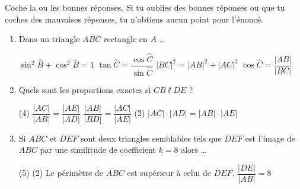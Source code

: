 %
%
    Coche la ou les bonnes réponses. Si tu oublies des bonnes réponses ou que tu coches des mauvaises réponses, tu n'obtiens aucun point pour l'énoncé.
    \begin{enumerate}
        \item Dans un triangle $ABC$ rectangle en $A$ \dots
              \begin{QCM}
                  \choice $\sin^2\widehat{B} + \cos^2\widehat{B}=1$
                  \choice $\tan\widehat{C} = \dfrac{\cos\widehat{C}}{\sin\widehat{C}}$
                  \choice $|BC|^2 = |AB|^2 + |AC|^2$
                  \choice $\cos\widehat{C}=\dfrac{|AB|}{|BC|}$
              \end{QCM}
        \item Quels sont les proportions exactes si $CB\sslash DE$ ? 
              \begin{QCM}(4)
                  \choice $\dfrac{|AC|}{|AB|}=\dfrac{|AE|}{|AD|}$
                  \choice $\dfrac{|AB|}{|BD|}=\dfrac{|AC|}{|AE|}$
                  \choice*(2) $|AC|\cdot |AD| = |AB| \cdot |AE|$
              \end{QCM}
        \item Si $ABC$ et $DEF$ sont deux triangles semblables tels que $DEF$ est l'image de $ABC$ par une similitude de coefficient $k=8$ alors \dots
              \begin{QCM}(5)
                  \choice*(2) Le périmètre de $ABC$ est supérieur à celui de $DEF$.
                  \choice $\dfrac{|DE|}{|AB|}=8$

\end{QCM}
\end{enumerate}
